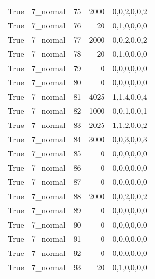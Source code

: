 \begin{tabular}{llrrl}
 True            & 7\_normal            &            75 &                  2000 & 0,0,2,0,0,2   \\
 True            & 7\_normal            &            76 &                    20 & 0,1,0,0,0,0   \\
 True            & 7\_normal            &            77 &                  2000 & 0,0,2,0,0,2   \\
 True            & 7\_normal            &            78 &                    20 & 0,1,0,0,0,0   \\
 True            & 7\_normal            &            79 &                     0 & 0,0,0,0,0,0   \\
 True            & 7\_normal            &            80 &                     0 & 0,0,0,0,0,0   \\
 True            & 7\_normal            &            81 &                  4025 & 1,1,4,0,0,4   \\
 True            & 7\_normal            &            82 &                  1000 & 0,0,1,0,0,1   \\
 True            & 7\_normal            &            83 &                  2025 & 1,1,2,0,0,2   \\
 True            & 7\_normal            &            84 &                  3000 & 0,0,3,0,0,3   \\
 True            & 7\_normal            &            85 &                     0 & 0,0,0,0,0,0   \\
 True            & 7\_normal            &            86 &                     0 & 0,0,0,0,0,0   \\
 True            & 7\_normal            &            87 &                     0 & 0,0,0,0,0,0   \\
 True            & 7\_normal            &            88 &                  2000 & 0,0,2,0,0,2   \\
 True            & 7\_normal            &            89 &                     0 & 0,0,0,0,0,0   \\
 True            & 7\_normal            &            90 &                     0 & 0,0,0,0,0,0   \\
 True            & 7\_normal            &            91 &                     0 & 0,0,0,0,0,0   \\
 True            & 7\_normal            &            92 &                     0 & 0,0,0,0,0,0   \\
 True            & 7\_normal            &            93 &                    20 & 0,1,0,0,0,0   \\

\end{tabular}

